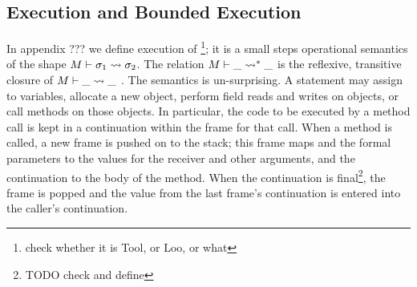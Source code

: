 \subsection{Execution and Bounded Execution}
 
In appendix ??? we  define execution  of \Loo\footnote{check whether it is Tool, or Loo, or what};
 it is a small steps operational semantics of the shape $M \vdash \sigma_1 \leadsto {\sigma_2}$. 
 The relation $M \vdash \_ \leadsto^* {\_}$  is the reflexive, transitive closure of $M \vdash \_ \leadsto {\_}$ .
The semantics is un-surprising. 
 A statement may assign to variables, allocate a new object, 
perform field reads and writes on objects,  or
 call methods on those objects. 
In particular, the code to be executed by a method call is kept in a continuation within the frame for that call. When a method is called, a new frame is pushed on to the stack; this frame  maps  and the formal parameters to  the values for the receiver and other arguments, and the continuation to the body of the method.  When the continuation is final\footnote{TODO check and define}, the frame is popped and the value from the last frame's continuation is entered into the caller's continuation. 



